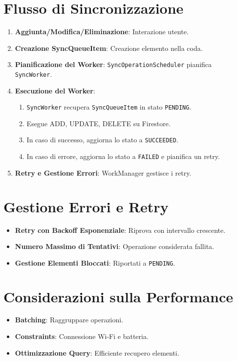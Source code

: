 \documentclass{article}
\begin{document}
\section{Flusso di Sincronizzazione}\label{sec:flusso-di-sincronizzazione}
\begin{enumerate}
    \item \textbf{Aggiunta/Modifica/Eliminazione}: Interazione utente.
    \item \textbf{Creazione SyncQueueItem}: Creazione elemento nella coda.
    \item \textbf{Pianificazione del Worker}: \texttt{SyncOperationScheduler}
    pianifica \texttt{SyncWorker}.
    \item \textbf{Esecuzione del Worker}:
    \begin{enumerate}
        \item \texttt{SyncWorker} recupera \texttt{SyncQueueItem} in stato
        \texttt{PENDING}.
        \item Esegue ADD, UPDATE, DELETE su Firestore.
        \item In caso di successo, aggiorna lo stato a \texttt{SUCCEEDED}.
        \item In caso di errore, aggiorna lo stato a \texttt{FAILED} e pianifica
        un retry.
    \end{enumerate}
    \item \textbf{Retry e Gestione Errori}: WorkManager gestisce i retry.
\end{enumerate}

\section{Gestione Errori e Retry}\label{sec:gestione-errori-e-retry}
\begin{itemize}
    \item \textbf{Retry con Backoff Esponenziale}: Riprova con intervallo
    crescente.
    \item \textbf{Numero Massimo di Tentativi}: Operazione considerata fallita.
    \item \textbf{Gestione Elementi Bloccati}: Riportati a \texttt{PENDING}.
\end{itemize}

\section{Considerazioni sulla
Performance}\label{sec:considerazioni-sulla-performance}
\begin{itemize}
    \item \textbf{Batching}: Raggruppare operazioni.
    \item \textbf{Constraints}: Connessione Wi-Fi e batteria.
    \item \textbf{Ottimizzazione Query}: Efficiente recupero elementi.
\end{itemize}
\end{document}
